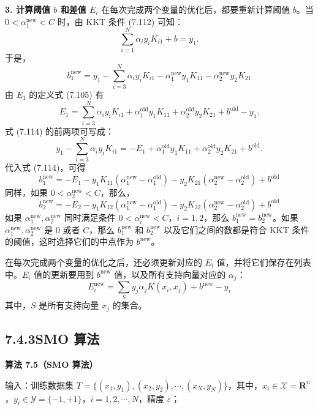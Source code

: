 \documentclass[UTF8,12pt,a4paper,fontset=fandol]{ctexart}
\begin{document}
\noindent\textbf{3. 计算阈值 $b$ 和差值 $E_i$}\quad
在每次完成两个变量的优化后，都要重新计算阈值 $b$。当 $0<\alpha_1^{\mathrm{new}}<C$ 时，由 KKT 条件 (7.112) 可知：
\[
\sum_{i=1}^N\alpha_i y_iK_{i1}+b=y_1.
\]
于是，
\begin{equation}
b_1^{\mathrm{new}}=y_1-\sum_{i=3}^N\alpha_i y_iK_{i1}-\alpha_1^{\mathrm{new}}y_1K_{11}-\alpha_2^{\mathrm{new}}y_2K_{21}
\tag{7.114}
\end{equation}
由 $E_1$ 的定义式 (7.105) 有
\[
E_1=\sum_{i=3}^N\alpha_i y_iK_{i1}+\alpha_1^{\mathrm{old}}y_1K_{11}+\alpha_2^{\mathrm{old}}y_2K_{21}+b^{\mathrm{old}}-y_1.
\]
式 (7.114) 的前两项可写成：
\[
y_1-\sum_{i=3}^N\alpha_i y_iK_{i1}
=-E_1+\alpha_1^{\mathrm{old}}y_1K_{11}+\alpha_2^{\mathrm{old}}y_2K_{21}+b^{\mathrm{old}}.
\]
代入式 (7.114)，可得
\begin{equation}
b_1^{\mathrm{new}}=-E_1-y_1K_{11}(\alpha_1^{\mathrm{new}}-\alpha_1^{\mathrm{old}})
-y_2K_{21}(\alpha_2^{\mathrm{new}}-\alpha_2^{\mathrm{old}})+b^{\mathrm{old}}
\tag{7.115}
\end{equation}
同样，如果 $0<\alpha_2^{\mathrm{new}}<C$，那么，
\begin{equation}
b_2^{\mathrm{new}}=-E_2-y_1K_{12}(\alpha_1^{\mathrm{new}}-\alpha_1^{\mathrm{old}})
-y_2K_{22}(\alpha_2^{\mathrm{new}}-\alpha_2^{\mathrm{old}})+b^{\mathrm{old}}
\tag{7.116}
\end{equation}
如果 $\alpha_1^{\mathrm{new}},\alpha_2^{\mathrm{new}}$ 同时满足条件 $0<\alpha_i^{\mathrm{new}}<C$，$i=1,2$，那么 $b_1^{\mathrm{new}}=b_2^{\mathrm{new}}$。如果 $\alpha_1^{\mathrm{new}},\alpha_2^{\mathrm{new}}$ 是 0 或者 $C$，那么 $b_1^{\mathrm{new}}$ 和 $b_2^{\mathrm{new}}$ 以及它们之间的数都是符合 KKT 条件的阈值，这时选择它们的中点作为 $b^{\mathrm{new}}$。

在每次完成两个变量的优化之后，还必须更新对应的 $E_i$ 值，并将它们保存在列表中。$E_i$ 值的更新要用到 $b^{\mathrm{new}}$ 值，以及所有支持向量对应的 $\alpha_j$：
\begin{equation}
E_i^{\mathrm{new}}=\sum_S y_j\alpha_jK(x_i,x_j)+b^{\mathrm{new}}-y_i
\tag{7.117}
\end{equation}
其中，$S$ 是所有支持向量 $x_j$ 的集合。

\subsection*{7.4.3\quad SMO 算法}

\noindent\textbf{算法 7.5（SMO 算法）}

输入：训练数据集 $T=\{(x_1,y_1),(x_2,y_2),\cdots,(x_N,y_N)\}$，其中，$x_i\in\mathcal{X}=\mathbf{R}^n$，$y_i\in\mathcal{Y}=\{-1,+1\}$，$i=1,2,\cdots,N$，精度 $\varepsilon$；
\end{document}
